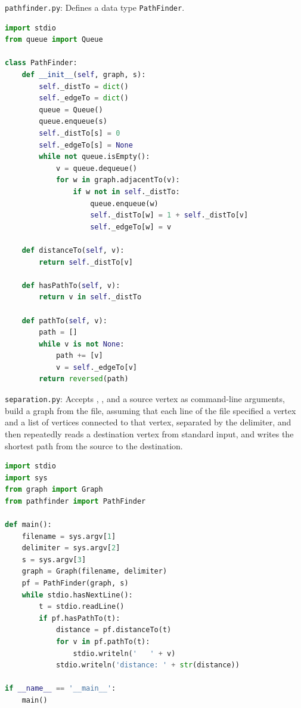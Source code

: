\documentclass[8pt,a4paper,compress,handout]{beamer}
\begin{document}
\begin{frame}[fragile]
\begin{framed}
\tiny \lstinline{pathfinder.py}: Defines a data type \lstinline{PathFinder}.
\end{framed}

\begin{lstlisting}[language=Python]
import stdio
from queue import Queue

class PathFinder:
    def __init__(self, graph, s):
        self._distTo = dict()
        self._edgeTo = dict()
        queue = Queue()
        queue.enqueue(s)
        self._distTo[s] = 0
        self._edgeTo[s] = None
        while not queue.isEmpty():
            v = queue.dequeue()
            for w in graph.adjacentTo(v):
                if w not in self._distTo:
                    queue.enqueue(w)
                    self._distTo[w] = 1 + self._distTo[v]
                    self._edgeTo[w] = v
    
    def distanceTo(self, v):
        return self._distTo[v]
        
    def hasPathTo(self, v):
        return v in self._distTo

    def pathTo(self, v):
        path = []
        while v is not None:
            path += [v]
            v = self._edgeTo[v]
        return reversed(path)
\end{lstlisting}
\end{frame}

\begin{frame}[fragile]
\begin{framed}
\tiny \lstinline{separation.py}: Accepts , , and a source vertex  as command-line
arguments, build a graph from the file, assuming that each line of the file specified a vertex and a list of vertices connected to that vertex, separated by the delimiter, and then repeatedly reads a
destination vertex from standard input, and writes the shortest path
from the source to the destination.
\end{framed}

\begin{lstlisting}[language=Python]
import stdio
import sys
from graph import Graph
from pathfinder import PathFinder

def main():
    filename = sys.argv[1]
    delimiter = sys.argv[2]
    s = sys.argv[3]
    graph = Graph(filename, delimiter)
    pf = PathFinder(graph, s)
    while stdio.hasNextLine():
        t = stdio.readLine()
        if pf.hasPathTo(t):
            distance = pf.distanceTo(t)
            for v in pf.pathTo(t):
                stdio.writeln('   ' + v)
            stdio.writeln('distance: ' + str(distance))

if __name__ == '__main__':
    main()
\end{lstlisting}
\end{frame}
\end{document}
